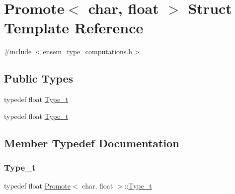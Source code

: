 \hypertarget{structPromote_3_01char_00_01float_01_4}{}\section{Promote$<$ char, float $>$ Struct Template Reference}
\label{structPromote_3_01char_00_01float_01_4}


{\ttfamily \#include $<$ensem\+\_\+type\+\_\+computations.\+h$>$}

\subsection*{Public Types}
\begin{DoxyCompactItemize}
\item 
typedef float \mbox{\hyperlink{structPromote_3_01char_00_01float_01_4_a1b84f2980103f92d2d15d421d34d78ea}{Type\+\_\+t}}
\item 
typedef float \mbox{\hyperlink{structPromote_3_01char_00_01float_01_4_a1b84f2980103f92d2d15d421d34d78ea}{Type\+\_\+t}}
\end{DoxyCompactItemize}


\subsection{Member Typedef Documentation}
\mbox{\label{structPromote_3_01char_00_01float_01_4_a1b84f2980103f92d2d15d421d34d78ea}} 
\subsubsection{\texorpdfstring{Type\_t}{Type\_t}\hspace{0.1cm}{\footnotesize\ttfamily [1/2]}}
{\footnotesize\ttfamily typedef float \mbox{\hyperlink{structPromote}{Promote}}$<$ char, float $>$\+::\mbox{\hyperlink{structPromote_3_01char_00_01float_01_4_a1b84f2980103f92d2d15d421d34d78ea}{Type\+\_\+t}}}

\mbox{\label{structPromote_3_01char_00_01float_01_4_a1b84f2980103f92d2d15d421d34d78ea}} 
